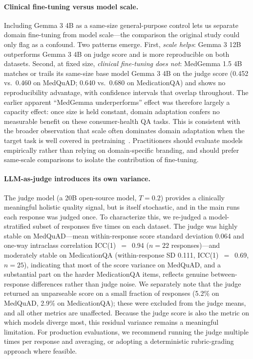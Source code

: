 \documentclass[10pt,letterpaper]{article}
\begin{document}
\paragraph{Clinical fine-tuning versus model scale.}
Including Gemma 3 4B as a same-size general-purpose control lets us
separate domain fine-tuning from model scale---the comparison the
original study could only flag as a confound. Two patterns emerge.
First, \emph{scale helps}: Gemma 3 12B outperforms Gemma 3 4B on judge
score and is more reproducible on both datasets. Second, at fixed size,
\emph{clinical fine-tuning does not}: MedGemma 1.5 4B matches or trails
its same-size base model Gemma 3 4B on the judge score (0.452 vs.\ 0.460
on MedQuAD; 0.640 vs.\ 0.680 on MedicationQA) and shows no reproducibility
advantage, with confidence intervals that overlap throughout. The earlier
apparent ``MedGemma underperforms'' effect was therefore largely a
capacity effect: once size is held constant, domain adaptation confers no
measurable benefit on these consumer-health QA tasks.
This is consistent with the broader observation that scale often
dominates domain adaptation when the target task is well covered in
pretraining~\cite{singhal2023large, nori2023gpt4med}.
Practitioners should evaluate models empirically rather than relying
on domain-specific branding, and should prefer same-scale comparisons
to isolate the contribution of fine-tuning.

\paragraph{LLM-as-judge introduces its own variance.}
The judge model (a 20B open-source model, $T{=}0.2$) provides a
clinically meaningful holistic quality signal, but is itself
stochastic, and in the main runs each response was judged once.
To characterize this, we re-judged a model-stratified subset of
responses five times on each dataset. The judge was highly stable on
MedQuAD---mean within-response score standard deviation 0.064 and
one-way intraclass correlation ICC(1)~$=$~0.94 ($n{=}22$
responses)---and moderately stable on MedicationQA (within-response SD
0.111, ICC(1)~$=$~0.69, $n{=}25$), indicating that most of the score
variance on MedQuAD, and a substantial part on the harder MedicationQA
items, reflects genuine between-response differences rather than judge
noise. We separately note that the judge returned an unparseable score
on a small fraction of responses (5.2\% on MedQuAD, 2.9\% on
MedicationQA); these were excluded from the judge means, and all other
metrics are unaffected. Because the judge score is also the metric on
which models diverge most, this residual variance remains a meaningful
limitation. For production evaluations, we recommend running the judge
multiple times per response and averaging, or adopting a deterministic
rubric-grading approach where feasible.
\end{document}
